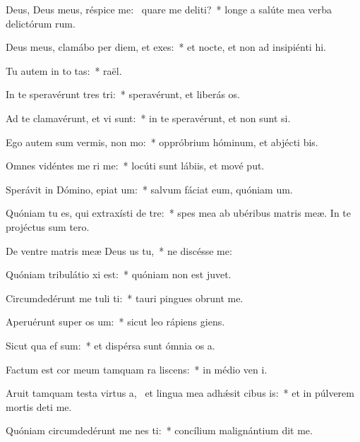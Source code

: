 \item Deus, Deus meus, réspice  me:~\pscross{} quare me deliti?~* longe a salúte mea verba delictórum rum.
\item Deus meus, clamábo per diem, et  exes:~* et nocte, et non ad insipiénti hi.
\item Tu autem in to tas:~*  raël.
\item In te speravérunt tres tri:~* speravérunt, et liberás os.
\item Ad te clamavérunt, et vi  sunt:~* in te speravérunt, et non sunt si.
\item Ego autem sum vermis,  non mo:~* oppróbrium hóminum, et abjécti bis.
\item Omnes vidéntes me ri me:~* locúti sunt lábiis, et mové put.
\item Sperávit in Dómino, epiat um:~* salvum fáciat eum, quóniam  um.
\item Quóniam tu es, qui extraxísti  de tre:~* spes mea ab ubéribus matris meæ. In te projéctus sum  tero.
\item De ventre matris meæ Deus us  tu,~* ne discésse  me:
\item Quóniam tribulátio xi est:~* quóniam non est  juvet.
\item Circumdedérunt me tuli ti:~* tauri pingues obrunt me.
\item Aperuérunt super  os um:~* sicut leo rápiens  giens.
\item Sicut qua ef sum:~* et dispérsa sunt ómnia os a.
\item Factum est cor meum tamquam ra liscens:~* in médio ven i.
\item Aruit tamquam testa virtus a,~\pscross{} et lingua mea adhǽsit cibus is:~* et in púlverem mortis deti me.
\item Quóniam circumdedérunt me nes ti:~* concílium malignántium dit me.
